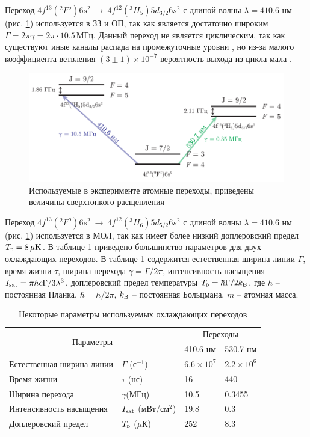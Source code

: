 




Переход $4f^{13}({}^2F^o)6 s^2 \ \to\ 4f^{12}({}^3H_5)5d_{3/2}6s^2$ с длиной волны $\lambda = 410.6$ нм (рис. \ref{fig:Tm}) используется в ЗЗ и ОП, так как является достаточно широким $\Gamma = 2 \pi \gamma = 2\pi \cdot 10.5\, \text{МГц}$. Данный переход не является циклическим, так как существуют иные каналы распада на промежуточные уровни \cite{vlad}, но из-за малого коэффициента ветвления $(3\pm1)\times 10^{-7}$ вероятность выхода из цикла мала \cite{Kolachevsky2007}.


\begin{figure}[h]
    \centering
    \includegraphics{figs/tm.pdf}
    \caption{Используемые в эксперименте атомные переходы, приведены величины сверхтонкого расщепления \cite{Kolachevsky2007}}
    \label{fig:Tm}
\end{figure}


Переход $4f^{13}({}^2F^o)6 s^2 \ \to\ 4f^{12}({}^3H_6)5d_{5/2}6s^2$ с длиной волны $\lambda = 410.6$ нм (рис. \ref{fig:Tm}) используется в МОЛ, так как имеет более низкий доплеровский предел  $\subt{T}{D} = 8\, \mu\text{K}$. В таблице \ref{tab:tm} приведено большинство параметров для двух охлаждающих переходов. В таблице \ref{tab:tm} содержится естественная ширина линии $\Gamma$, время жизни $\tau$, ширина перехода $\gamma = \Gamma / 2\pi$, интенсивность насыщения $I_{\textnormal{sat}} = \pi h c \Gamma / 3 \lambda^3$, доплеровский предел температуры $\subt{T}{D} = \hbar \Gamma / 2 \kB$, где $h$ -- постоянная Планка, $\hbar = h / 2\pi$, $k_{\textnormal{B}}$ -- постоянная Больцмана, $m$ -- атомная масса.

\begin{table}[h]
	\caption{Некоторые параметры используемых охлаждающих переходов}
	\label{tab:tm}
	\centering
	\begin{tabular}{ll|ll}
	\toprule
	\multicolumn{2}{c}{\multirow{2}{*}{Параметры}} & \multicolumn{2}{c}{Переходы} \\
	&& 410.6 нм &  530.7 нм \\
	\midrule
	Естественная ширина линии & $\Gamma$ (с${}^{-1}$) & $6.6 \times 10^7$ & $2.2 \times 10^6$ \\
	Время жизни & $\tau$ (нс) & 16 & 440 \\
	Ширина перехода  & $\gamma$(МГц) & 10.5 & 0.3455 \\
	Интенсивность насыщения & $I_{\textnormal{sat}}$ (мВт/см${}^2$) & 19.8 & 0.3 \\
	Доплеровский предел & $\subt{T}{D}$ ($\mu$К) & 252 & 8.3 \\
	\bottomrule
	\end{tabular}
\end{table}


% 	